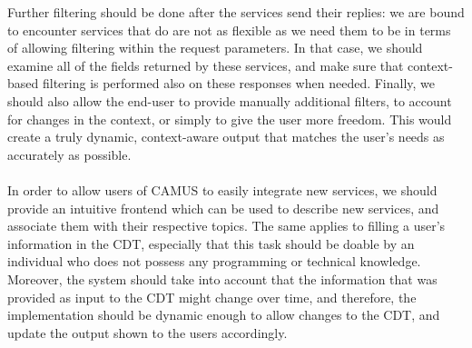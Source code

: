 Further filtering should be done after the services send their replies: we are bound to encounter services that do are not as flexible as we need them to be in terms of allowing filtering within the request parameters. In that case, we should examine all of the fields returned by these services, and make sure that context-based filtering is performed also on these responses when needed. Finally, we should also allow the end-user to provide manually additional filters, to account for changes in the context, or simply to give the user more freedom. This would create a truly dynamic, context-aware output that matches the user's needs as accurately as possible.\\\\
In order to allow users of CAMUS to easily integrate new services, we should provide an intuitive frontend which can be used to describe new services, and associate them with their respective topics. The same applies to filling a user's information in the CDT, especially that this task should be doable by an individual who does not possess any programming or technical knowledge. Moreover, the system should take into account that the information that was provided as input to the CDT might change over time, and therefore, the implementation should be dynamic enough to allow changes to the CDT, and update the output shown to the users accordingly.\\\\
